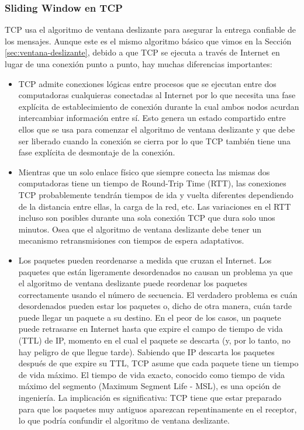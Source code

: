 \subsubsection{Sliding Window en TCP}
TCP usa el algoritmo de ventana deslizante para asegurar la entrega confiable de los mensajes. Aunque este es el mismo algoritmo básico que vimos en la Sección \ref{sec:ventana-deslizante}, debido a que TCP se ejecuta a través de Internet en lugar de una conexión punto a punto, hay muchas diferencias importantes:
\begin{itemize}
  \item TCP admite conexiones lógicas entre procesos que se ejecutan entre dos computadoras cualquieras conectadas al Internet por lo que necesita una fase explícita de establecimiento de conexión durante la cual ambos nodos acurdan intercambiar información entre sí. Esto genera un estado compartido entre ellos que se usa para comenzar el algoritmo de ventana deslizante y que debe ser liberado cuando la conexión se cierra por lo que TCP también tiene una fase explícita de desmontaje de la conexión.
  \item Mientras que un solo enlace físico que siempre conecta las mismas dos computadoras tiene un tiempo de Round-Trip Time (RTT), las conexiones TCP probablemente tendrán tiempos de ida y vuelta diferentes dependiendo de la distancia entre ellas, la carga de la red, etc. Las variaciones en el RTT incluso son posibles durante una sola conexión TCP que dura solo unos minutos. Osea que el algoritmo de ventana deslizante debe tener un mecanismo retransmisiones con tiempos de espera adaptativos.
  \item Los paquetes pueden reordenarse a medida que cruzan el Internet. Los paquetes que están ligeramente desordenados no causan un problema ya que el algoritmo de ventana deslizante puede reordenar los paquetes correctamente usando el número de secuencia. El verdadero problema es cuán desordenados pueden estar los paquetes o, dicho de otra manera, cuán tarde puede llegar un paquete a su destino. En el peor de los casos, un paquete puede retrasarse en Internet hasta que expire el campo de tiempo de vida (TTL) de IP, momento en el cual el paquete se descarta (y, por lo tanto, no hay peligro de que llegue tarde). Sabiendo que IP descarta los paquetes después de que expire su TTL, TCP asume que cada paquete tiene un tiempo de vida máximo. El tiempo de vida exacto, conocido como tiempo de vida máximo del segmento (Maximum Segment Life - MSL), es una opción de ingeniería. La implicación es significativa: TCP tiene que estar preparado para que los paquetes muy antiguos aparezcan repentinamente en el receptor, lo que podría confundir el algoritmo de ventana deslizante.

\end{itemize}
